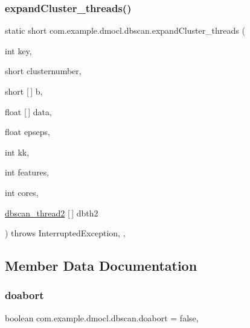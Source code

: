 \subsubsection{\texorpdfstring{expand\+Cluster\+\_\+threads()}{expandCluster\_threads()}}
{\footnotesize\ttfamily static short com.\+example.\+dmocl.\+dbscan.\+expand\+Cluster\+\_\+threads (\begin{DoxyParamCaption}\item[{int}]{key,  }\item[{short}]{clusternumber,  }\item[{short \mbox{[}$\,$\mbox{]}}]{b,  }\item[{float \mbox{[}$\,$\mbox{]}}]{data,  }\item[{float}]{epseps,  }\item[{int}]{kk,  }\item[{int}]{features,  }\item[{int}]{cores,  }\item[{\mbox{\hyperlink{classcom_1_1example_1_1dmocl_1_1dbscan_1_1dbscan__thread2}{dbscan\+\_\+thread2}} \mbox{[}$\,$\mbox{]}}]{dbth2 }\end{DoxyParamCaption}) throws Interrupted\+Exception\hspace{0.3cm}{\ttfamily [inline]}, {\ttfamily [static]}, {\ttfamily [private]}}



\subsection{Member Data Documentation}
\mbox{\label{classcom_1_1example_1_1dmocl_1_1dbscan_a614b6e11c265a9291ad5e7b2a81e3524}} 
\subsubsection{\texorpdfstring{doabort}{doabort}}
{\footnotesize\ttfamily boolean com.\+example.\+dmocl.\+dbscan.\+doabort = false\hspace{0.3cm}{\ttfamily [static]}, {\ttfamily [private]}}

\mbox{\label{classcom_1_1example_1_1dmocl_1_1dbscan_ad1fe5e758b8545a61ec38b2329ffc96d}} 
